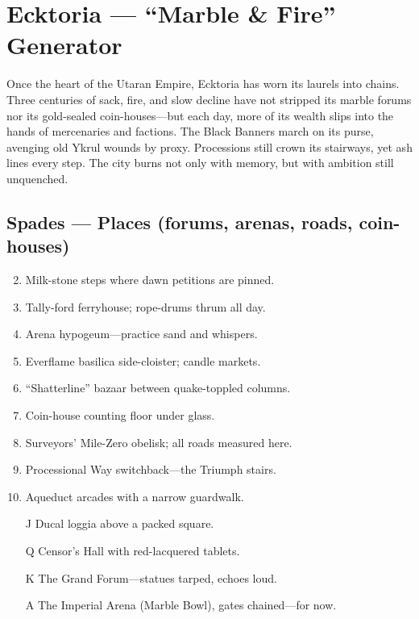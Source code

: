 \section{Ecktoria --- ``Marble \& Fire'' Generator}
\label{chap:ecktoria}

Once the heart of the Utaran Empire, Ecktoria has worn its laurels into chains. Three centuries of sack, fire, and slow decline have not stripped its marble forums nor its gold-sealed coin-houses—but each day, more of its wealth slips into the hands of mercenaries and factions. The Black Banners march on its purse, avenging old Ykrul wounds by proxy. Processions still crown its stairways, yet ash lines every step. The city burns not only with memory, but with ambition still unquenched.

\subsection*{Spades --- Places (forums, arenas, roads, coin-houses)}
\label{sec:ecktoria-places}
\begin{enumerate}
\setcounter{enumi}{1}
\item Milk-stone steps where dawn petitions are pinned.
\item Tally-ford ferryhouse; rope-drums thrum all day.
\item Arena hypogeum---practice sand and whispers.
\item Everflame basilica side-cloister; candle markets.
\item ``Shatterline'' bazaar between quake-toppled columns.
\item Coin-house counting floor under glass.
\item Surveyors' Mile-Zero obelisk; all roads measured here.
\item Processional Way switchback---the Triumph stairs.
\item Aqueduct arcades with a narrow guardwalk.
\item[J] Ducal loggia above a packed square.
\item[Q] Censor's Hall with red-lacquered tablets.
\item[K] The Grand Forum---statues tarped, echoes loud.
\item[A] The Imperial Arena (Marble Bowl), gates chained---for now.
\end{enumerate}

